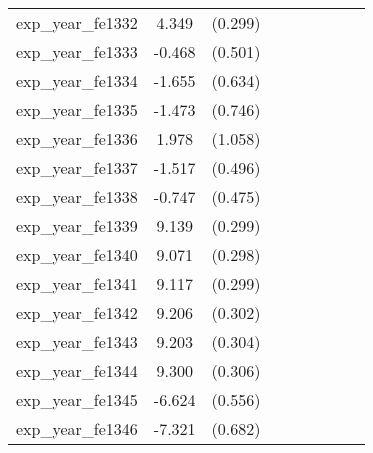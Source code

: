{\begin{tabular}{l*{4}{cc}}
exp\_year\_fe1332&    4.349\sym{***}&  (0.299)&                  &         &                  &         &                  &         \\
exp\_year\_fe1333&   -0.468         &  (0.501)&                  &         &                  &         &                  &         \\
exp\_year\_fe1334&   -1.655\sym{**} &  (0.634)&                  &         &                  &         &                  &         \\
exp\_year\_fe1335&   -1.473\sym{*}  &  (0.746)&                  &         &                  &         &                  &         \\
exp\_year\_fe1336&    1.978         &  (1.058)&                  &         &                  &         &                  &         \\
exp\_year\_fe1337&   -1.517\sym{**} &  (0.496)&                  &         &                  &         &                  &         \\
exp\_year\_fe1338&   -0.747         &  (0.475)&                  &         &                  &         &                  &         \\
exp\_year\_fe1339&    9.139\sym{***}&  (0.299)&                  &         &                  &         &                  &         \\
exp\_year\_fe1340&    9.071\sym{***}&  (0.298)&                  &         &                  &         &                  &         \\
exp\_year\_fe1341&    9.117\sym{***}&  (0.299)&                  &         &                  &         &                  &         \\
exp\_year\_fe1342&    9.206\sym{***}&  (0.302)&                  &         &                  &         &                  &         \\
exp\_year\_fe1343&    9.203\sym{***}&  (0.304)&                  &         &                  &         &                  &         \\
exp\_year\_fe1344&    9.300\sym{***}&  (0.306)&                  &         &                  &         &                  &         \\
exp\_year\_fe1345&   -6.624\sym{***}&  (0.556)&                  &         &                  &         &                  &         \\
exp\_year\_fe1346&   -7.321\sym{***}&  (0.682)&                  &         &                  &         &                  &         \\

\end{tabular}}

